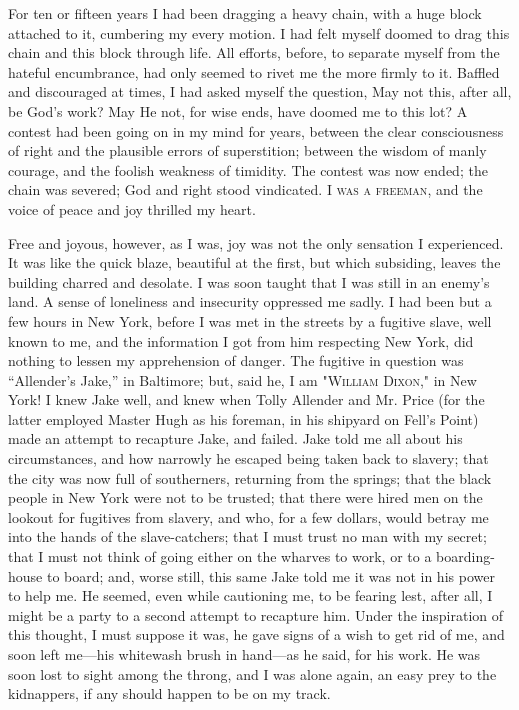 For ten or fifteen years I had been dragging a heavy chain, with a huge
block attached to it, cumbering my every motion. I had felt myself
doomed {\protect\hypertarget{337}{}{}}to drag this chain and this block
through life. All efforts, before, to separate myself from the hateful
encumbrance, had only seemed to rivet me the more firmly to it. Baffled
and discouraged at times, I had asked myself the question, May not this,
after all, be God's work? May He not, for wise ends, have doomed me to
this lot? A contest had been going on in my mind for years, between the
clear consciousness of right and the plausible errors of superstition;
between the wisdom of manly courage, and the foolish weakness of
timidity. The contest was now ended; the chain was severed; God and
right stood vindicated. \textsc{I was a freeman}, and the voice of peace
and joy thrilled my heart.

Free and joyous, however, as I was, joy was not the only sensation I
experienced. It was like the quick blaze, beautiful at the first, but
which subsiding, leaves the building charred and desolate. I was soon
taught that I was still in an enemy's land. A sense of loneliness and
insecurity oppressed me sadly. I had been but a few hours in New York,
before I was met in the streets by a fugitive slave, well known to me,
and the information I got from him respecting New York, did nothing to
lessen my apprehension of danger. The fugitive in question was
``Allender's Jake,'' in Baltimore; but, said he, I am "\textsc{William
Dixon}," in New York! I knew Jake well, and knew when Tolly Allender and
Mr. Price (for the latter employed Master Hugh as his foreman, in his
shipyard on Fell's Point) made an attempt to recapture Jake, and failed.
Jake told me all about his circumstances, and how narrowly he
{\protect\hypertarget{338}{}{}}escaped being taken back to slavery; that
the city was now full of southerners, returning from the springs; that
the black people in New York were not to be trusted; that there were
hired men on the lookout for fugitives from slavery, and who, for a few
dollars, would betray me into the hands of the slave-catchers; that I
must trust no man with my secret; that I must not think of going either
on the wharves to work, or to a boarding-house to board; and, worse
still, this same Jake told me it was not in his power to help me. He
seemed, even while cautioning me, to be fearing lest, after all, I might
be a party to a second attempt to recapture him. Under the inspiration
of this thought, I must suppose it was, he gave signs of a wish to get
rid of me, and soon left me---his whitewash brush in hand---as he said,
for his work. He was soon lost to sight among the throng, and I was
alone again, an easy prey to the kidnappers, if any should happen to be
on my track.

